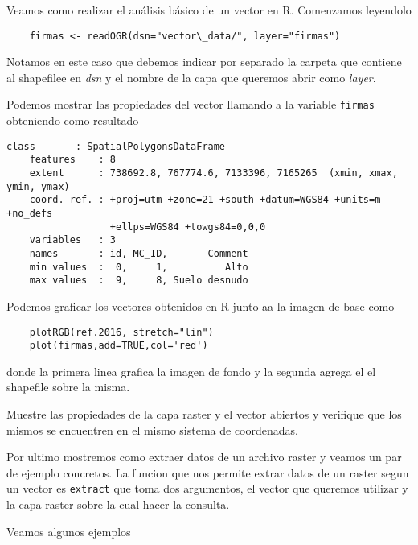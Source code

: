 \begin{exa}
    Veamos como realizar el an\'alisis b\'asico de un vector en R. Comenzamos
    leyendolo

    \begin{lstlisting}
    firmas <- readOGR(dsn="vector\_data/", layer="firmas")
    \end{lstlisting}

    Notamos en este caso que debemos indicar por separado la carpeta que
    contiene al shapefilee en \emph{dsn} y el nombre de la capa que queremos
    abrir como \emph{layer}.

    Podemos mostrar las propiedades del vector llamando a la variable
    \texttt{firmas} obteniendo como resultado
    \begin{Verbatim}[fontsize=\small]
    class       : SpatialPolygonsDataFrame
    features    : 8
    extent      : 738692.8, 767774.6, 7133396, 7165265  (xmin, xmax, ymin, ymax)
    coord. ref. : +proj=utm +zone=21 +south +datum=WGS84 +units=m +no_defs
                  +ellps=WGS84 +towgs84=0,0,0
    variables   : 3
    names       : id, MC_ID,       Comment
    min values  :  0,     1,          Alto
    max values  :  9,     8, Suelo desnudo
    \end{Verbatim}

    Podemos graficar los vectores obtenidos en R junto aa la imagen de base como

    \begin{lstlisting}
    plotRGB(ref.2016, stretch="lin")
    plot(firmas,add=TRUE,col='red')
    \end{lstlisting}
    donde la primera linea grafica la imagen de fondo y la segunda agrega el
    el shapefile sobre la misma.
\end{exa}

\begin{act}
    Muestre las propiedades de la capa raster y el vector abiertos y verifique
    que los mismos se encuentren en el mismo sistema de coordenadas.
\end{act}

Por ultimo mostremos como extraer datos de un archivo raster y veamos un par de
ejemplo concretos. La funcion que nos permite extrar datos de un raster segun
un vector es \texttt{extract} que toma dos argumentos, el vector que queremos
utilizar y la capa raster sobre la cual hacer la consulta.

Veamos algunos ejemplos

